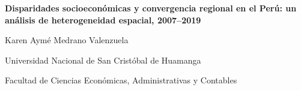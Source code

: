 \documentclass[12pt,a4paper]{article}
\begin{document}
\thispagestyle{plain}

\begin{center}
{\Large\bfseries
Disparidades socioeconómicas y convergencia regional en el Perú:
un análisis de heterogeneidad espacial, 2007--2019
\par}

\vspace{0.6em}

{\normalsize Karen Aymé Medrano Valenzuela\par}
{\normalsize Universidad Nacional de San Cristóbal de Huamanga\par}
{\normalsize Facultad de Ciencias Económicas, Administrativas y Contables\par}
\end{center}

\vspace{0.5em}









\printbibliography[
  heading=bibintoc,
  title={Referencias}
]

\appendix

\end{document}
